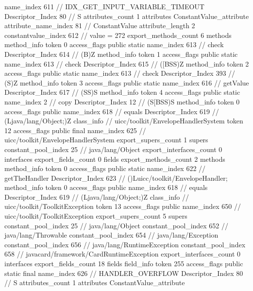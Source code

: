 {{{{{				name_index	611		// IDX_GET_INPUT_VARIABLE_TIMEOUT
				Descriptor_Index	80		// S
				attributes_count	1
				attributes {
				ConstantValue_attribute {
					attribute_name_index	81		// ConstantValue
					attribute_length	2
					constantvalue_index	612		// value = 272
				}
				}
			}
			}
			export_methods_count	6
			methods {
				method_info {
					token	0
					access_flags	public static
					name_index	613		// check
					Descriptor_Index	614		// (B)Z
				}
				method_info {
					token	1
					access_flags	public static
					name_index	613		// check
					Descriptor_Index	615		// ([BSS)Z
				}
				method_info {
					token	2
					access_flags	public static
					name_index	613		// check
					Descriptor_Index	393		// (S)Z
				}
				method_info {
					token	3
					access_flags	public static
					name_index	616		// getValue
					Descriptor_Index	617		// (SS)S
				}
				method_info {
					token	4
					access_flags	public static
					name_index	2		// copy
					Descriptor_Index	12		// (S[BSS)S
				}
				method_info {
					token	0
					access_flags	public
					name_index	618		// equals
					Descriptor_Index	619		// (Ljava/lang/Object;)Z
				}
			}
		}
		class_info {		// uicc/toolkit/EnvelopeHandlerSystem
			token	12
			access_flags	public final
			name_index	625		// uicc/toolkit/EnvelopeHandlerSystem
			export_supers_count	1
			supers {
				constant_pool_index	25		// java/lang/Object
			}
			export_interfaces_count	0
			interfaces {
			}
			export_fields_count	0
			fields {
			}
			export_methods_count	2
			methods {
				method_info {
					token	0
					access_flags	public static
					name_index	622		// getTheHandler
					Descriptor_Index	623		// ()Luicc/toolkit/EnvelopeHandler;
				}
				method_info {
					token	0
					access_flags	public
					name_index	618		// equals
					Descriptor_Index	619		// (Ljava/lang/Object;)Z
				}
			}
		}
		class_info {		// uicc/toolkit/ToolkitException
			token	13
			access_flags	public
			name_index	650		// uicc/toolkit/ToolkitException
			export_supers_count	5
			supers {
				constant_pool_index	25		// java/lang/Object
				constant_pool_index	652		// java/lang/Throwable
				constant_pool_index	654		// java/lang/Exception
				constant_pool_index	656		// java/lang/RuntimeException
				constant_pool_index	658		// javacard/framework/CardRuntimeException
			}
			export_interfaces_count	0
			interfaces {
			}
			export_fields_count	18
			fields {
			field_info {
				token	255
				access_flags	public static final
				name_index	626		// HANDLER_OVERFLOW
				Descriptor_Index	80		// S
				attributes_count	1
				attributes {
				ConstantValue_attribute {
}}}}}}}
